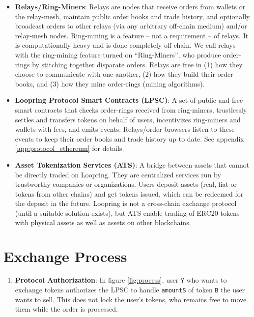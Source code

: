 \documentclass[UTF8,nofonts]{article}
\begin{document}
\begin{multicols}{2}
\begin{itemize}
\item \textbf{Relays/Ring-Miners}: Relays are nodes that receive orders from wallets or the relay-mesh, maintain public order books and trade history, and optionally broadcast orders to other relays (via any arbitrary off-chain medium) and/or relay-mesh nodes. Ring-mining is a feature -- not a requirement -- of relays. It is computationally heavy and is done completely off-chain. We call relays with the ring-mining feature turned on \enquote{Ring-Miners}, who produce order-rings by stitching together disparate orders. Relays are free in (1) how they choose to communicate with one another, (2) how they build their order books, and (3) how they mine order-rings (mining algorithms).

\item \textbf{Loopring Protocol Smart Contracts (LPSC)}: A set of public and free smart contracts that checks order-rings received from ring-miners, trustlessly settles and transfers tokens on behalf of users, incentivizes ring-miners and wallets with fees, and emits events. Relays/order browsers listen to these events to keep their order books and trade history up to date. See appendix \ref{app:protocol_ethereum} for details.

\item \textbf{Asset Tokenization Services (ATS)}: A bridge between assets that cannot be directly traded on Loopring. They are centralized services run by trustworthy companies or organizations. Users deposit assets (real, fiat or tokens from other chains) and get tokens issued, which can be redeemed for the deposit in the future. Loopring is not a cross-chain exchange protocol (until a suitable solution exists), but ATS enable trading of ERC20 tokens \cite{ERC20} with physical assets as well as assets on other blockchains. 

\end{itemize}


\section{Exchange Process\label{sec:process}}



\begin{enumerate} 


\item \textbf{Protocol Authorization}: In figure \ref{fig:process}, user \verb|Y| who wants to exchange tokens authorizes the LPSC to handle \verb|amountS| of token \verb|B| the user wants to sell. This does not lock the user's tokens, who remains free to move them while the order is processed.


\end{enumerate}
\end{multicols}
\end{document}
